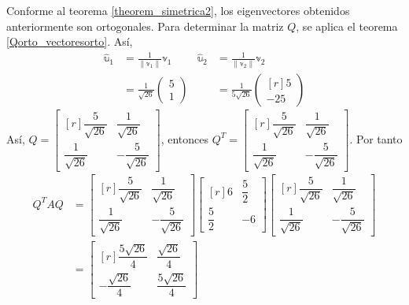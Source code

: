 \begin{example}
    Conforme al teorema \ref{theorem_simetrica2}, los eigenvectores obtenidos anteriormente son ortogonales. Para determinar la matriz $Q$, se aplica el teorema \ref{Qorto_vectoresorto}. Así,
    \begin{align*}
        \hat{\mathbb{u}}_1 & = \frac{1}{\| \mathbb{v}_1 \|} \mathbb{v}_1 & \hat{\mathbb{u}}_2 & = \frac{1}{\| \mathbb{v}_2 \|} \mathbb{v}_2 \\
        & = \frac{1}{\sqrt{26}} \begin{pmatrix} 5 \\ 1 \end{pmatrix} & & = \frac{1}{5\sqrt{26}} \begin{pmatrix*}[r] 5 \\ -25 \end{pmatrix*}
    \end{align*}
    Así, $Q = \begin{bmatrix*}[r]
        \dfrac{5}{\sqrt{26}} & \dfrac{1}{\sqrt{26}} \\[3mm]
        \dfrac{1}{\sqrt{26}} & -\dfrac{5}{\sqrt{26}}
    \end{bmatrix*}$, entonces $Q^T = \begin{bmatrix*}[r]
        \dfrac{5}{\sqrt{26}} & \dfrac{1}{\sqrt{26}} \\[3mm]
        \dfrac{1}{\sqrt{26}} & -\dfrac{5}{\sqrt{26}}
    \end{bmatrix*}$. Por tanto
    \begin{align*}
        Q^TAQ & = \begin{bmatrix*}[r]
            \dfrac{5}{\sqrt{26}} & \dfrac{1}{\sqrt{26}} \\[3mm]
            \dfrac{1}{\sqrt{26}} & -\dfrac{5}{\sqrt{26}}
        \end{bmatrix*} \begin{bmatrix*}[r]
            6 & \dfrac{5}{2} \\[2mm]
            \dfrac{5}{2} & - 6
        \end{bmatrix*} \begin{bmatrix*}[r]
            \dfrac{5}{\sqrt{26}} & \dfrac{1}{\sqrt{26}} \\[3mm]
            \dfrac{1}{\sqrt{26}} & -\dfrac{5}{\sqrt{26}}
        \end{bmatrix*} \\
        & = \begin{bmatrix*}[r]
            \dfrac{5\sqrt{26}}{4} & \dfrac{\sqrt{26}}{4} \\[3mm]
            - \dfrac{\sqrt{26}}{4} & \dfrac{5\sqrt{26}}{4}

\end{bmatrix*}
\end{align*}
\end{example}
